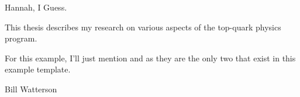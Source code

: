 \begin{acknowledgements}
Hannah, I Guess.
\end{acknowledgements}


\begin{preface}
  This thesis describes my research on various aspects of the \ATLAS
  top-quark physics program.

  \noindent
  For this example, I'll just mention 
  and  as they are the only two that exist in this example template.
\end{preface}

\tableofcontents


%
  {Bill Watterson}
\thispagestyle{empty}
